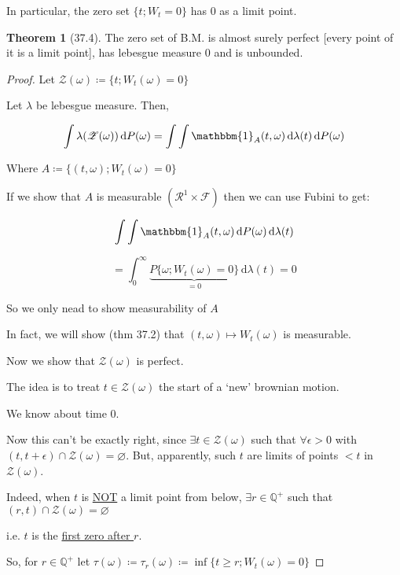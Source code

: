 \documentclass{article}
\theoremstyle{definition}
\newtheorem{theorem}{Theorem}
\begin{document}
In particular, the zero set \(\{ t ; W_t = 0 \}\) has \(0\) as a limit point.

\begin{theorem}
    [37.4] The zero set of B.M. is almost surely perfect [every point of it is a limit point], has lebesgue measure \(0\) and is unbounded.
\end{theorem}

\begin{proof}
    Let \(\mathscr{Z}(\omega) \coloneqq \{ t; W_t(\omega)=0 \}\)
    
    Let \(\lambda\) be lebesgue measure. Then,
    
    \[
        \int \lambda(\mathscr{Z}(\omega))\, \mathrm{d} P(\omega) = \int \int \mathbbm{1}_{A} (t, \omega) \, \mathrm{d} \lambda(t) \, \mathrm{d} P(\omega)
    \]

    Where \(A \coloneqq \{ (t,\omega) ; W_t(\omega) = 0\} \)
    
    If we show that \(A\) is measurable \((\mathcal{R}^1 \times \mathscr{F})\) then we can use Fubini to get:
    
    \[
        \int \int \mathbbm{1}_{A} (t, \omega) \, \mathrm{d} P(\omega) \, \mathrm{d} \lambda(t)
    \]

    \[
        = \int_{0}^{\infty} \underbrace{P \{ \omega ; W_t(\omega) = 0 \}}_{=0} \,\mathrm{d}\lambda(t) = 0
    \]

    So we only nead to show measurability of \(A\) 

    In fact, we will show (thm 37.2) that \((t,\omega) \mapsto W_t(\omega)\) is measurable.

    Now we show that \(\mathscr{Z}(\omega)\) is perfect. 

    The idea is to treat \(t\in \mathscr{Z}(\omega)\) the start of a `new' brownian motion.

    We know about time \(0\).

    Now this can't be exactly right, since \(\exists t \in \mathscr{Z}(\omega)\) such that \(\forall \epsilon > 0\) with \((t,t+\epsilon)\cap \mathscr{Z}(\omega)=\varnothing\). But, apparently, such \(t\) are limits of points \(< t\) in \(\mathscr{Z}(\omega)\).

    Indeed, when \(t\) is \underline{NOT} a limit point from below, \(\exists r \in \mathbb{Q} ^+\) such that \((r,t)\cap \mathscr{Z} (\omega) = \varnothing\) 

    i.e. \(t\) is the \underline{first zero after \(r\)}.
    
    So, for \(r\in\mathbb{Q}^+\) let \(\tau(\omega) \coloneqq \tau_r (\omega) \coloneqq \inf \{ t \geq r ; W_t(\omega) = 0 \} \)  


\end{proof}
\end{document}
